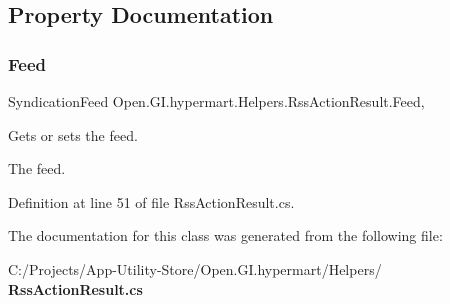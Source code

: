 \subsection{Property Documentation}
\mbox{\label{class_open_1_1_g_i_1_1hypermart_1_1_helpers_1_1_rss_action_result_a3b07cc4558b6a4863821fbedd9aa6888}} 
\subsubsection{Feed}
{\footnotesize\ttfamily Syndication\+Feed Open.\+G\+I.\+hypermart.\+Helpers.\+Rss\+Action\+Result.\+Feed\hspace{0.3cm}{\ttfamily [get]}, {\ttfamily [set]}}



Gets or sets the feed. 

The feed. 

Definition at line 51 of file Rss\+Action\+Result.\+cs.



The documentation for this class was generated from the following file\+:\begin{DoxyCompactItemize}
\item 
C\+:/\+Projects/\+App-\/\+Utility-\/\+Store/\+Open.\+G\+I.\+hypermart/\+Helpers/\textbf{ Rss\+Action\+Result.\+cs}\end{DoxyCompactItemize}
